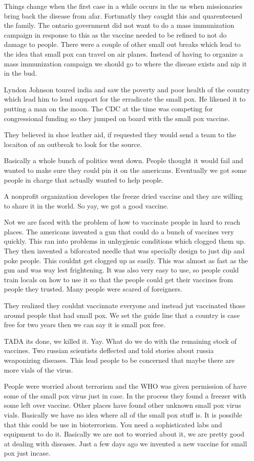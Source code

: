 \documentclass{article}
\begin{document}
Things change when the first case in a while occurs in the us when missionaries bring back the disease from afar. Fortunatly they caught this and quarenteened the family. The ontario government did not want to do a mass immunization campaign in response to this as the vaccine needed to be refined to not do damage to people. There were a couple of other small out breaks which lead to the idea that small pox can travel on air planes. Instead of having to organize a mass immunization campaign we should go to where the disease exists and nip it in the bud.

Lyndon Johnson toured india and saw  the poverty and poor health of the country which lead him to lend support for the erradicate the small pox. He likened it to putting a man on the moon. The CDC at the time was competing for congressional funding so they jumped on board with the small pox vaccine.

They believed in shoe leather aid, if requested they would send a team to the locaiton of an outbreak to look for the source.

Basically a whole bunch of politics went down. People thought it would fail and wanted to make sure they could pin it on the americans. Eventually we got some people in charge that actually wanted to help people.

A nonprofit organization developes the freeze dried vaccine and they are willing to share it in the world. So yay, we got a good vaccine.

Not we are faced with the problem of how to vaccinate people in hard to reach places. The americans invented a gun that could do a bunch of vaccines very quickly. This ran into problems in unhygienic conditions which clogged them up. They then invented a biforcated needle that was specially design to just dip and poke people. This couldnt get clogged up as easily. This was almost as fast as the gun and was way lest frightening. It was also very easy to use, so people could train locals on how to use it so that the people could get their vaccines from people they trusted. Many people were scared of foreigners.

They realized they couldnt vaccinnate everyone and instead jut vaccinated those around people that had small pox. We set the guide line that a country is case free for two years then we can say it is small pox free.

TADA its done, we killed it. Yay. What do we do with the remaining stock of vaccines. Two russian scientists deffected and told stories about russia weaponizing diseases. This lead people to be concerned that maybe there are more vials of the virus.

People were worried about terrorism and the WHO was given permission of have some of the small pox virus just in case. In the process they found a freezer with some left over vaccine. Other places have found other unknown small pox virus vials. Basically we have no idea where all of the small pox stuff is. It is possible that this could be use in bioterrorism. You need a sophisticated labs and equipment to do it. Basically we are not to worried about it, we are pretty good at dealing with diseases. Just a few days ago we invented a new vaccine for small pox just incase.
\end{document}
